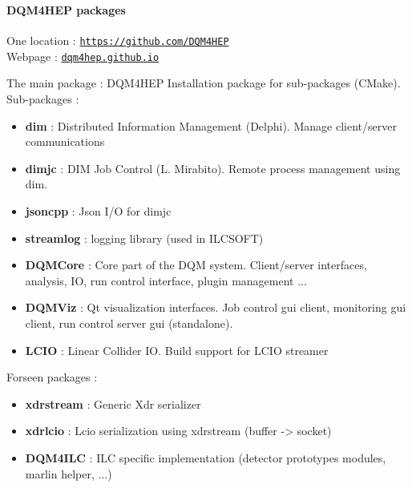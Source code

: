\documentclass[8pt]{beamer}
\begin{document}
  \begin{frame}
    \frametitle{\secname}
    \framesubtitle{DQM4HEP packages}

    One location : \href{https://github.com/DQM4HEP}{\tt https://github.com/DQM4HEP} \\
    Webpage : \href{dqm4hep.github.io}{\tt dqm4hep.github.io} \\
    \begin{block}{The main package : DQM4HEP}
      Installation package for sub-packages (CMake). \\
      Sub-packages :
      \begin{itemize}
        \item \textbf{dim} : Distributed Information Management (Delphi). Manage client/server communications
        \item \textbf{dimjc} : DIM Job Control (L. Mirabito). Remote process management using dim.
        \item \textbf{jsoncpp} : Json I/O for dimjc
        \item \textbf{streamlog} : logging library (used in ILCSOFT)
        \item \textbf{DQMCore} : Core part of the DQM system. Client/server interfaces, analysis, IO, run control interface, plugin management ...
        \item \textbf{DQMViz} : Qt visualization interfaces. Job control gui client, monitoring gui client, run control server gui (standalone).
        \item \textbf{LCIO} : Linear Collider IO. Build support for LCIO streamer
      \end{itemize}
      Forseen packages :
      \begin{itemize}
        \item \textbf{xdrstream} : Generic Xdr serializer
        \item \textbf{xdrlcio} : Lcio serialization using xdrstream (buffer -> socket)
        \item \textbf{DQM4ILC} : ILC specific implementation (detector prototypes modules, marlin helper, ...)
      \end{itemize}
    \end{block}

  \end{frame}
\end{document}

